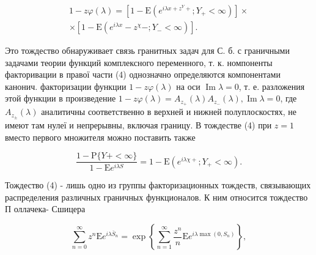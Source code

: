 \documentclass[10pt]{article}
\begin{document}
\[

\begin{gathered}

1-z \varphi(\lambda)=\left[1-\mathrm{E}\left(e^{i \lambda x+z^{Y}+} ; Y_{+}<\infty\right)\right] \times \\

\times\left[1-\mathrm{E}\left(e^{i \lambda x}-z^{\chi}-; Y_{-}<\infty\right)\right] .

\end{gathered}

\]



Это тождество обнаруживает связь гранитных задач для С. б. с граничными задачами теории функций комплексного переменного, т. к. номпоненты факторивации в правої части (4) однозначно определяются компонентами канонич. факторизации функции $1-z \varphi(\lambda)$ на оси $\operatorname{Im} \lambda=0$, т. е. разложения этой функции в произведение $1-z \varphi(\lambda)=A_{z_{+}}(\lambda) A_{z_{-}}(\lambda), \operatorname{Im} \lambda=0$, где $A_{z_{ \pm}}(\lambda)$ аналитичны соответственно в верхней и нижней полуплоскостях, не имеют там нулеї и непрерывны, включая границу. В тождестве (4) при $z=1$ вместо первого множителя можно поставить также



\[

\frac{1-\mathrm{P}\{Y+<\infty\}}{1-\mathrm{E} e^{i \lambda S}}=1-\mathrm{E}\left(e^{i \lambda \chi+} ; Y_{+}<\infty\right) .

\]



Тождество (4) - лишь одно из группы факторизационных тождеств, связывающих распределения различных граничных функционалов. К ним относится тождество П оллачека- Сшицера



\[

\sum_{n=0}^{\infty} z^{n} \mathrm{E} e^{i \lambda \bar{S}_{n}}=\exp \left\{\sum_{n=1}^{\infty} \frac{z^{n}}{n} \mathrm{E} e^{i \lambda \max \left(0, S_{n}\right)}\right\},

\]
\end{document}
